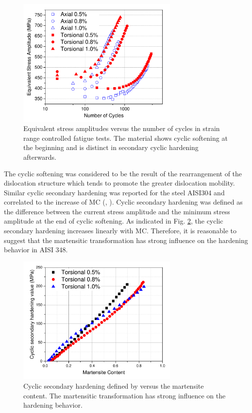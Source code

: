 \documentclass[preprint,5p,twocolumn,10pt,sort&compress]{elsarticle}
\begin{document}
\begin{figure}[!htb]
  \begin{center}
  \includegraphics[width=8cm]{total1.pdf}
  \caption{Equivalent stress amplitudes versus the number of cycles in strain range controlled fatigue tests. The material shows cyclic softening at the beginning and is distinct in secondary cyclic hardening afterwards. }
  \label{fig:total1}
  \end{center}
\end{figure}

The cyclic softening was considered to be the result of the rearrangement of the dislocation structure which tends to promote the greater dislocation mobility. Similar cyclic secondary hardening was reported for the steel AISI304 and correlated to the increase of  MC (\citeauthor{Pegues2017Cyclic}, \citeyear{Pegues2017Cyclic}). Cyclic secondary hardening  was defined as the difference between the current stress amplitude and the minimum stress amplitude at the end of cyclic softening. As indicated in Fig. \ref{fig:SecondaryHardening}, the cyclic secondary hardening  increases linearly with  MC. Therefore, it is reasonable to suggest that the martensitic transformation has strong influence on the hardening behavior in AISI 348.

\begin{figure}[!h]
  \begin{center}
  \includegraphics[width=8cm]{SecondaryHardening.pdf}
  \caption{Cyclic secondary hardening defined by \cite{Pegues2017Cyclic} versus the martensite content. The martensitic transformation has strong influence on the hardening behavior.}
  \label{fig:SecondaryHardening}
  \end{center}
\end{figure}
\end{document}

